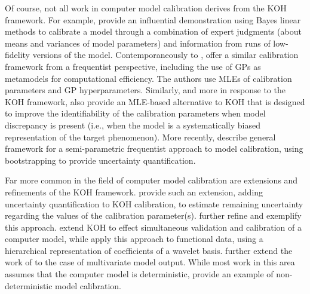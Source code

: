 \documentclass[12pt]{article}
\begin{document}
Of course, not all work in computer model calibration derives from the KOH framework.
For example, \citet{Craig1997} provide an influential demonstration using Bayes linear methods to calibrate a model through a combination of expert judgments (about means and variances of model parameters) and information from runs of low-fidelity versions of the model.
Contemporaneously to \citet{Kennedy2001}, \citet{Cox2001} offer a similar calibration framework from a frequentist perspective, including the use of GPs as metamodels for computational efficiency. 
The authors use MLEs of calibration parameters and GP hyperparameters.
Similarly, and more in response to the KOH framework, \citet{Loeppky2006} also provide an MLE-based alternative to KOH that is designed to improve the identifiability of the calibration parameters when model discrepancy is present (i.e., when the model is a systematically biased representation of the target phenomenon).
More recently, \citet{Wong2014} describe general framework for a semi-parametric frequentist approach to model calibration, using bootstrapping to provide uncertainty quantification.

Far more common in the field of computer model calibration are extensions and refinements of the KOH framework.
\citet{Higdon2004} provide such an extension, adding uncertainty quantification to KOH calibration, to estimate remaining uncertainty regarding the values of the calibration parameter(s).
\citet{Williams2006} further refine and exemplify this approach.
\citet{Bayarri2007a} extend KOH to effect simultaneous validation and calibration of a computer model, while \citet{Bayarri2007b} apply this approach to functional data, using a hierarchical representation of coefficients of a wavelet basis.
\citet{Paulo2012} further extend the work of \citet{Bayarri2007a} to the case of multivariate model output.
While most work in this area assumes that the computer model is deterministic, \citet{Pratola2018} provide an example of non-deterministic model calibration.
\end{document}
